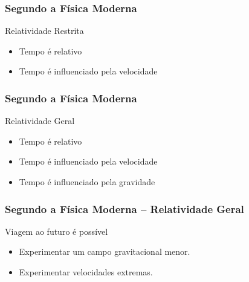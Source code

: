 \begin{frame}
    \frametitle{Segundo a Física Moderna}
    
    \begin{block}{Relatividade Restrita}
        \begin{itemize}
            \item Tempo é relativo
            \item Tempo é influenciado pela velocidade
        \end{itemize}
    \end{block}
\end{frame}

\begin{frame}
    \frametitle{Segundo a Física Moderna}
    
    \begin{block}{Relatividade Geral}
        \begin{itemize}
            \item Tempo é relativo
            \item Tempo é influenciado pela velocidade
            \item Tempo é influenciado pela gravidade
        \end{itemize}
    \end{block}
\end{frame}

\begin{frame}
    \frametitle{Segundo a Física Moderna -- Relatividade Geral}
    
    \begin{block}{Viagem ao futuro é possível}
        \begin{itemize}
            \item Experimentar um campo gravitacional menor.
            \item Experimentar velocidades extremas.
        \end{itemize}
    \end{block}

\end{frame}

